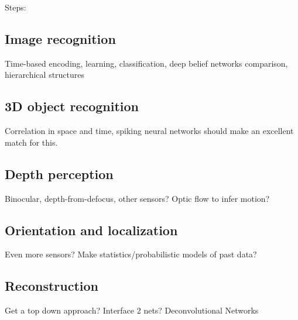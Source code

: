 Steps:
\subsection{Image recognition}
\label{subsec:intro:plan:2D-recognition}
Time-based encoding, learning, classification, deep belief networks comparison, hierarchical structures

\subsection{3D object recognition}
\label{subsec:intro:plan:3D-recognition}
Correlation in space and time, spiking neural networks should make an excellent match for this.

\subsection{Depth perception}
\label{subsec:intro:plan:depth-perception}
Binocular, depth-from-defocus, other sensors? Optic flow to infer motion?

\subsection{Orientation and localization}
\label{subsec:intro:plan:localization}
Even more sensors? Make statistics/probabilistic models of past data?

\subsection{Reconstruction}
\label{subsec:intro:plan:reconstruction}
Get a top down approach? Interface 2 nets?
Deconvolutional Networks
